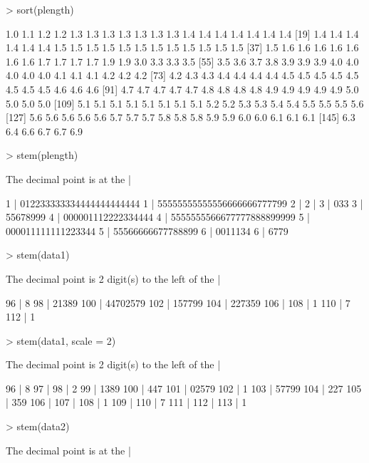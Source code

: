 \begin{Schunk}
\begin{Sinput}
> sort(plength)
\end{Sinput}
\begin{Soutput}
  [1] 1.0 1.1 1.2 1.2 1.3 1.3 1.3 1.3 1.3 1.3 1.3 1.4 1.4 1.4 1.4 1.4 1.4 1.4
 [19] 1.4 1.4 1.4 1.4 1.4 1.4 1.5 1.5 1.5 1.5 1.5 1.5 1.5 1.5 1.5 1.5 1.5 1.5
 [37] 1.5 1.6 1.6 1.6 1.6 1.6 1.6 1.6 1.7 1.7 1.7 1.7 1.9 1.9 3.0 3.3 3.3 3.5
 [55] 3.5 3.6 3.7 3.8 3.9 3.9 3.9 4.0 4.0 4.0 4.0 4.0 4.1 4.1 4.1 4.2 4.2 4.2
 [73] 4.2 4.3 4.3 4.4 4.4 4.4 4.4 4.5 4.5 4.5 4.5 4.5 4.5 4.5 4.5 4.6 4.6 4.6
 [91] 4.7 4.7 4.7 4.7 4.7 4.8 4.8 4.8 4.8 4.9 4.9 4.9 4.9 4.9 5.0 5.0 5.0 5.0
[109] 5.1 5.1 5.1 5.1 5.1 5.1 5.1 5.1 5.2 5.2 5.3 5.3 5.4 5.4 5.5 5.5 5.5 5.6
[127] 5.6 5.6 5.6 5.6 5.6 5.7 5.7 5.7 5.8 5.8 5.8 5.9 5.9 6.0 6.0 6.1 6.1 6.1
[145] 6.3 6.4 6.6 6.7 6.7 6.9
\end{Soutput}
\begin{Sinput}
> stem(plength)
\end{Sinput}
\begin{Soutput}
  The decimal point is at the |

  1 | 012233333334444444444444
  1 | 55555555555556666666777799
  2 | 
  2 | 
  3 | 033
  3 | 55678999
  4 | 000001112222334444
  4 | 5555555566677777888899999
  5 | 000011111111223344
  5 | 55566666677788899
  6 | 0011134
  6 | 6779
\end{Soutput}
\begin{Sinput}
> stem(data1)
\end{Sinput}
\begin{Soutput}
  The decimal point is 2 digit(s) to the left of the |

   96 | 8
   98 | 21389
  100 | 44702579
  102 | 157799
  104 | 227359
  106 | 
  108 | 1
  110 | 7
  112 | 1
\end{Soutput}
\begin{Sinput}
> stem(data1, scale = 2)
\end{Sinput}
\begin{Soutput}
  The decimal point is 2 digit(s) to the left of the |

   96 | 8
   97 | 
   98 | 2
   99 | 1389
  100 | 447
  101 | 02579
  102 | 1
  103 | 57799
  104 | 227
  105 | 359
  106 | 
  107 | 
  108 | 1
  109 | 
  110 | 7
  111 | 
  112 | 
  113 | 1
\end{Soutput}
\begin{Sinput}
> stem(data2)
\end{Sinput}
\begin{Soutput}
  The decimal point is at the |


\end{Soutput}
\end{Schunk}
